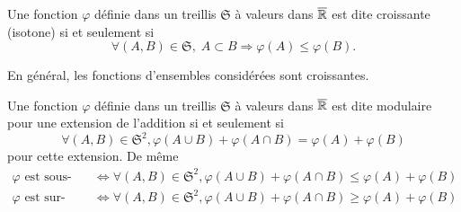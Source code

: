 \begin{defi}
  Une fonction $\varphi$ définie dans un treillis $\mathfrak{S}$ à valeurs dans $\overline{\mathbb{R}}$ est dite croissante (isotone) si et seulement si
  \begin{displaymath}
    \forall (A,B) \in \mathfrak{S},\; A \subset B \Rightarrow \varphi(A) \leq \varphi(B).
  \end{displaymath}
\end{defi}
\noindent En général, les fonctions d'ensembles considérées sont croissantes.

\begin{defi}
  Une fonction $\varphi$ définie dans un treillis $\mathfrak{S}$ à valeurs dans $\overline{\mathbb{R}}$ est dite modulaire pour une extension de l'addition si et seulement si
\begin{displaymath}
  \forall (A,B) \in \mathfrak{S}^2, \varphi(A \cup B) + \varphi(A \cap B) = \varphi(A) + \varphi(B)
\end{displaymath}
pour cette extension. De même
\begin{align*}
  \varphi \text{ est sous-modulaire } &\Leftrightarrow \forall (A,B) \in \mathfrak{S}^2, \varphi(A \cup B) + \varphi(A \cap B) \leq \varphi(A) + \varphi(B) \\
  \varphi \text{ est sur-modulaire } &\Leftrightarrow \forall (A,B) \in \mathfrak{S}^2, \varphi(A \cup B) + \varphi(A \cap B) \geq \varphi(A) + \varphi(B)
\end{align*}
\end{defi}


